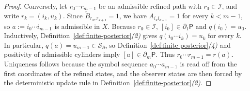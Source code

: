 \documentclass{etds}%
\numberwithin{equation}{section}
\theoremstyle{plain}
\theoremstyle{definition}
\theoremstyle{remark}
\begin{document}
\begin{proof}
Conversely, let $r_0\cdots r_{m-1}$ be an admissible refined path with
$r_0\in\mathcal{I}$, and write $r_k=(i_k,u_k)$.  Since
$\widetilde{B}_{r_k,r_{k+1}}=1$, we have $A_{i_ki_{k+1}}=1$ for every $k<m-1$,
so $a:=i_0\cdots i_{m-1}$ is admissible in $X$.  Because $r_0\in\mathcal{I}$,
$[i_0]\in\partial_1\mathsf{P}$ and $q(i_0)=u_0$.  Inductively,
Definition~\ref{def:finite-posterior}\emph{(2)} gives
$q(i_0\cdots i_k)=u_k$ for every $k$.  In particular,
$q(a)=u_{m-1}\in\mathcal{S}_\partial$, so Definition~\ref{def:finite-posterior}\emph{(4)}
and positivity of admissible cylinders imply $[a]\in\partial_m\mathsf{P}$.
Thus $r_0\cdots r_{m-1}=r(a)$.  Uniqueness follows because the symbol sequence
$a_0\cdots a_{m-1}$ is read off from the first coordinates of the refined
states, and the observer states are then forced by the deterministic update
rule in Definition~\ref{def:finite-posterior}\emph{(2)}.
\end{proof}
\end{document}

